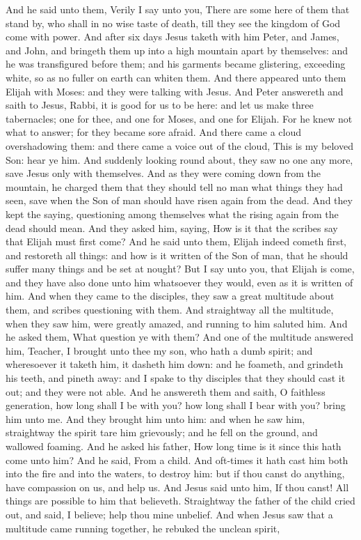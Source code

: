 And he said unto them, Verily I say unto you, There are some here of them that stand by, who shall in no wise taste of death, till they see the kingdom of God come with power.  And after six days Jesus taketh with him Peter, and James, and John, and bringeth them up into a high mountain apart by themselves: and he was transfigured before them; and his garments became glistering, exceeding white, so as no fuller on earth can whiten them. And there appeared unto them Elijah with Moses: and they were talking with Jesus. And Peter answereth and saith to Jesus, Rabbi, it is good for us to be here: and let us make three tabernacles; one for thee, and one for Moses, and one for Elijah. For he knew not what to answer; for they became sore afraid. And there came a cloud overshadowing them: and there came a voice out of the cloud, This is my beloved Son: hear ye him. And suddenly looking round about, they saw no one any more, save Jesus only with themselves.  And as they were coming down from the mountain, he charged them that they should tell no man what things they had seen, save when the Son of man should have risen again from the dead. And they kept the saying, questioning among themselves what the rising again from the dead should mean. And they asked him, saying, How is it that the scribes say that Elijah must first come? And he said unto them, Elijah indeed cometh first, and restoreth all things: and how is it written of the Son of man, that he should suffer many things and be set at nought? But I say unto you, that Elijah is come, and they have also done unto him whatsoever they would, even as it is written of him.  And when they came to the disciples, they saw a great multitude about them, and scribes questioning with them. And straightway all the multitude, when they saw him, were greatly amazed, and running to him saluted him. And he asked them, What question ye with them? And one of the multitude answered him, Teacher, I brought unto thee my son, who hath a dumb spirit; and wheresoever it taketh him, it dasheth him down: and he foameth, and grindeth his teeth, and pineth away: and I spake to thy disciples that they should cast it out; and they were not able. And he answereth them and saith, O faithless generation, how long shall I be with you? how long shall I bear with you? bring him unto me. And they brought him unto him: and when he saw him, straightway the spirit tare him grievously; and he fell on the ground, and wallowed foaming. And he asked his father, How long time is it since this hath come unto him? And he said, From a child. And oft-times it hath cast him both into the fire and into the waters, to destroy him: but if thou canst do anything, have compassion on us, and help us. And Jesus said unto him, If thou canst! All things are possible to him that believeth. Straightway the father of the child cried out, and said, I believe; help thou mine unbelief. And when Jesus saw that a multitude came running together, he rebuked the unclean spirit, 